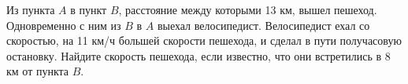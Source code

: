 \begin{ex}
	\begin{condition}
	Из пункта \( A \) в пункт \( B \), расстояние между которыми 13 км, вышел пешеход. Одновременно с ним из \( B \) в \( A \) выехал велосипедист. Велосипедист ехал со скоростью, на 11 км/ч большей скорости пешехода, и сделал в пути получасовую остановку. Найдите скорость пешехода, если известно, что они встретились в 8 км от пункта \( B \).
	\end{condition}
\end{ex}